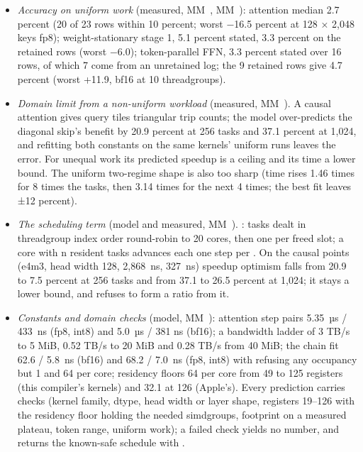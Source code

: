 \begin{itemize}
\item \emph{Accuracy on uniform work} (measured, MM~, MM~): attention median 2.7 percent (20 of 23 rows within 10
  percent; worst −16.5 percent at 128 × 2,048 keys fp8); weight-stationary stage 1, 5.1 percent stated, 3.3 percent on
  the retained rows (worst −6.0); token-parallel FFN, 3.3 percent stated over 16 rows, of which 7 come from an
  unretained log; the 9 retained rows give 4.7 percent (worst +11.9, bf16 at 10 threadgroups).
\item \emph{Domain limit from a non-uniform workload} (measured, MM~). A causal attention gives query tiles triangular trip
  counts; the model over-predicts the diagonal skip's benefit by 20.9 percent at 256 tasks and 37.1 percent at 1,024,
  and refitting both constants on the same kernels' uniform runs leaves the error. For unequal work its predicted
  speedup is a ceiling and its time a lower bound. The uniform two-regime shape is also too sharp (time rises
  1.46 times for 8 times the tasks, then 3.14 times for the next 4 times; the best fit leaves ±12 percent).
\item \emph{The scheduling term} (model and measured, MM~). : tasks dealt in threadgroup
  index order round-robin to 20 cores, then one per freed slot; a core with n resident tasks advances each one step per
  . On the causal points (e4m3, head width 128,  2,868~ns,  327~ns) speedup
  optimism falls from 20.9 to 7.5 percent at 256 tasks and from 37.1 to 26.5 percent at 1,024; it stays a lower bound,
  and  refuses to form a ratio from it.
\item \emph{Constants and domain checks} (model, MM~): attention step pairs 5.35~µs / 433~ns (fp8, int8) and 5.0~µs / 381
  ns (bf16); a bandwidth ladder of 3 TB/s to 5 MiB, 0.52 TB/s to 20 MiB and 0.28 TB/s from 40 MiB; the chain fit 62.6 /
  5.8~ns (bf16) and 68.2 / 7.0~ns (fp8, int8) with  refusing any occupancy but 1 and 64 per core; residency
  floors 64 per core from 49 to 125 registers (this compiler's kernels) and 32.1 at 126 (Apple's). Every prediction
  carries checks (kernel family, dtype, head width or layer shape, registers 19–126 with the residency floor holding
  the needed simdgroups, footprint on a measured plateau, token range, uniform work); a failed check yields no number,
  and  returns the known-safe schedule with .

\end{itemize}
